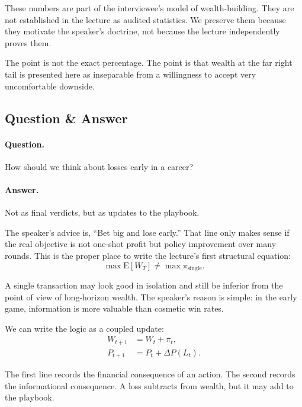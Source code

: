 \begin{remark}
These numbers are part of the interviewee's model of wealth-building. They are not established in the lecture as audited statistics. We preserve them because they motivate the speaker's doctrine, not because the lecture independently proves them.
\end{remark}

The point is not the exact percentage. The point is that wealth at the far right tail is presented here as inseparable from a willingness to accept very uncomfortable downside.

\subsection{Question \& Answer}

\paragraph{Question.} How should we think about losses early in a career?

\paragraph{Answer.} Not as final verdicts, but as updates to the playbook.

The speaker's advice is, ``Bet big and lose early.'' That line only makes sense if the real objective is not one-shot profit but policy improvement over many rounds. This is the proper place to write the lecture's first structural equation:
\begin{equation}
\max \mathrm{E}[W_T] \neq \max \pi_{\mathrm{single}}.
\end{equation}

A single transaction may look good in isolation and still be inferior from the point of view of long-horizon wealth. The speaker's reason is simple: in the early game, information is more valuable than cosmetic win rates.

We can write the logic as a coupled update:
\begin{align}
W_{t+1} &= W_t + \pi_t,\\
P_{t+1} &= P_t + \Delta P(L_t).
\end{align}

The first line records the financial consequence of an action. The second records the informational consequence. A loss subtracts from wealth, but it may add to the playbook.

